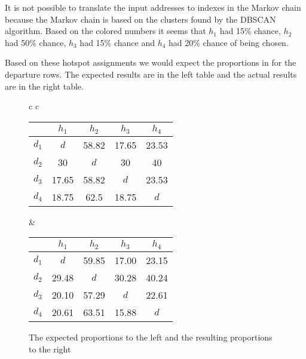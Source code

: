 It is not possible to translate the input addresses to indexes in the Markov chain because the Markov chain is based on the clusters found by the DBSCAN algorithm.
Based on the colored numbers it seems that $ h_1 $ had 15\% chance, $ h_2 $ had 50\% chance, $ h_3 $ had 15\% chance and $ h_4 $ had 20\% chance of being chosen.

Based on these hotspot assignments we would expect the proportions in  for the departure rows.
The expected results are in the left table and the actual results are in the right table.

\begin{figure}

\begin{tabular} {c c }

\begin{tabular}{ | c | c c c c |}
	\hline
	 & $ h_1 $ & $ h_2 $ & $ h_3 $ & $ h_4 $\\
	\hline
	$ d_1 $ & $ d $ & 58.82 & 17.65 & 23.53\\
	$ d_2 $ & 30 & $ d $ & 30 & 40\\
	$ d_3 $ & 17.65 & 58.82 & $ d $ & 23.53\\
	$ d_4 $ & 18.75 & 62.5 & 18.75 & $ d $\\
	\hline
\end{tabular}

&

\begin{tabular}{ | c | c c c c |}
	\hline
	& $ h_1 $ & $ h_2 $ & $ h_3 $ & $ h_4 $\\
	\hline
	$ d_1 $ & $ d $ & 59.85 & 17.00 & 23.15\\
	$ d_2 $ & 29.48 & $ d $ & 30.28 & 40.24\\
	$ d_3 $ & 20.10 & 57.29 & $ d $ & 22.61 \\
	$ d_4 $ & 20.61 & 63.51 & 15.88 & $ d $\\
	\hline
\end{tabular}
\end{tabular}
\caption{The expected proportions to the left and the resulting proportions to the right}\label{uneven_results}
\end{figure}

